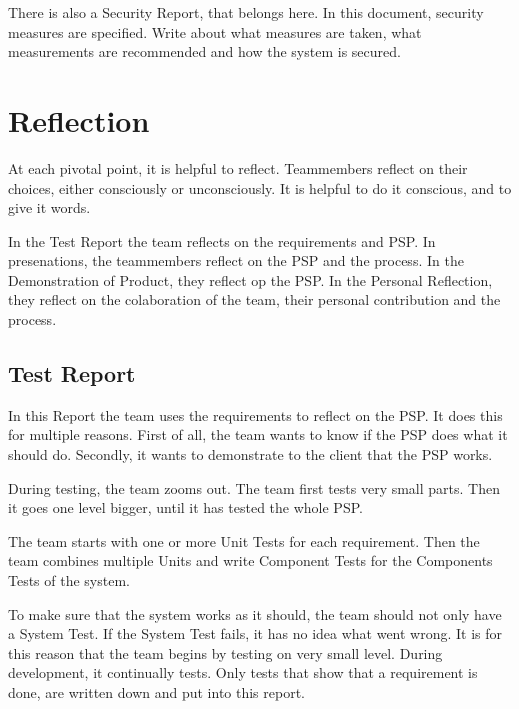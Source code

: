 \documentclass[10pt]{report}
\begin{document}
There is also a Security Report, that belongs here. In this document, security measures are specified. Write about what measures are taken, what measurements are recommended and how the system is secured.

\newpage

\chapter{Reflection}
\thispagestyle{fancy}

At each pivotal point, it is helpful to reflect. Teammembers reflect on their choices, either consciously or unconsciously. It is helpful to do it conscious, and to give it words.

In the Test Report the team reflects on the requirements and PSP. In presenations, the teammembers reflect on the PSP and the process. In the Demonstration of Product, they reflect op the PSP. In the Personal Reflection, they reflect on the colaboration of the team, their personal contribution and the process.

\medskip
\minitoc

\newpage

\section{Test Report}

In this Report the team uses the requirements to reflect on the PSP. It does this for multiple reasons. First of all, the team wants to know if the PSP does what it should do. Secondly, it wants to demonstrate to the client that the PSP works. 

During testing, the team zooms out. The team first tests very small parts. Then it goes one level bigger, until it has tested the whole PSP.

The team starts with one or more Unit Tests for each requirement. Then the team combines multiple Units and write Component Tests for the Components Tests of the system. 

\bigskip

To make sure that the system works as it should, the team should not only have a System Test. If the System Test fails, it has no idea what went wrong. It is for this reason that the team begins by testing on very small level. During development, it continually tests. Only tests that show that a requirement is done, are written down and put into this report.
\end{document}
